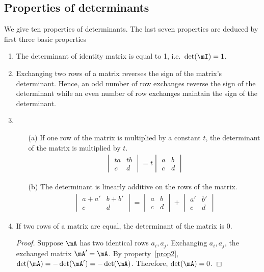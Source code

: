\documentclass[11pt]{article}
\theoremstyle{plain}
\theoremstyle{definition}
\begin{document}
\subsection{Properties of determinants}
We give ten properties of determinants. The last seven properties are deduced by first three basic properties
\begin{enumerate}
	\item\label{prop1} The determinant of identity matrix is equal to 1, i.e.\ $\det(\mI) = 1$.
	\item\label{prop2} Exchanging two rows of a matrix reverses the sign of the matrix's determinant. Hence, an odd number of row exchanges reverse the sign of the determinant while an even number of row exchanges maintain the sign of the determinant.
	\item \begin{enumerate} 
	\item[(a)]\label{prop3a} If one row of the matrix is multiplied by a constant $t$, the determinant of the matrix is multiplied by $t$.
	\begin{align}
		\begin{vmatrix}
			ta&tb\\c &d 
		\end{vmatrix} = t \begin{vmatrix}
			a&b\\c &d
			\end{vmatrix}
	\end{align} 
	\item[(b)]\label{prop3b} The determinant is linearly additive on the rows of the matrix.
	\begin{align}
		\begin{vmatrix}
			a+a'&b+b'\\c &d 
		\end{vmatrix} =  \begin{vmatrix}
			a&b\\c &d
			\end{vmatrix} +  \begin{vmatrix}
			a'&b'\\c &d
			\end{vmatrix} 
	\end{align}
	\end{enumerate}

	\item \label{propidenticalrow} If two rows of a matrix are equal, the determinant of the matrix is 0.  
	\begin{proof}
		Suppose $\mA$ has two identical rows $a_i, a_j$. Exchanging $a_i, a_j$, the exchanged matrix $\mA' = \mA$. By property~\ref{prop2}, $\det(\mA) = -\det(\mA') = -\det(\mA)$. Therefore, $\det(\mA) = 0$.
	\end{proof}


\end{enumerate}
\end{document}

